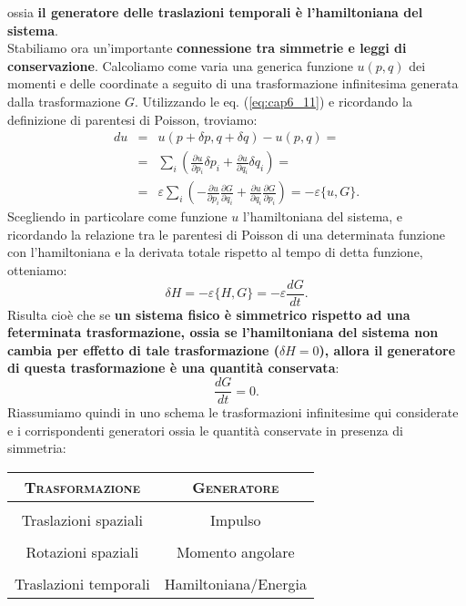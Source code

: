 \documentclass[a4paper,12pt,oneside]{book}
\begin{document}
ossia \textbf{il generatore delle traslazioni temporali è l'hamiltoniana del sistema}.\\
Stabiliamo ora un'importante \textbf{connessione tra simmetrie e leggi di conservazione}. Calcoliamo come varia una generica funzione $u(p,q)$ dei momenti e delle coordinate a seguito di una trasformazione infinitesima generata dalla trasformazione $G$. Utilizzando le eq. (\ref{eq:cap6_11}) e ricordando la definizione di parentesi di Poisson, troviamo:
\begin{eqnarray}
du & = & u(p+\delta p , q+\delta q )- u (p,q) = \nonumber \\
&=& \sum _i \left( \frac{\partial u}{\partial p_i} \delta p_i + \frac{\partial u}{\partial q_i } \delta q_i \right) = \nonumber \\
&=& \varepsilon \sum _i \left( -\frac{\partial u}{\partial p_i} \frac{\partial G}{\partial q_i} + \frac{\partial u}{\partial q_i } \frac{\partial G}{\partial p_i} \right) =-\varepsilon \{ u, G \} .
\end{eqnarray}
Scegliendo in particolare come funzione $u$ l'hamiltoniana del sistema,  e ricordando la relazione tra le parentesi di Poisson di una determinata funzione con l'hamiltoniana e la derivata totale rispetto al tempo di detta funzione, otteniamo:
\begin{equation}
\delta H = -\varepsilon \{H,G\} = -\varepsilon \frac{dG}{dt}.
\end{equation}
Risulta cioè che se \textbf{un sistema fisico è simmetrico rispetto ad una feterminata trasformazione, ossia se l'hamiltoniana del sistema non cambia per effetto di tale trasformazione ($\delta H =0$), allora il generatore di questa trasformazione è una quantità conservata}:
\begin{equation}
\frac{dG}{dt}=0.
\end{equation}
Riassumiamo quindi in uno schema le trasformazioni infinitesime qui considerate e i corrispondenti generatori ossia le quantità conservate in presenza di simmetria:

\begin{table}[!htbp]
\begin{center}
\begin{tabular}{c|c}
\textbf{\textsc{Trasformazione}} & \textbf{\textsc{Generatore}}\\
\hline \\
Traslazioni spaziali & Impulso \\
\hline \\
Rotazioni spaziali & Momento angolare \\
\hline \\
Traslazioni temporali &  Hamiltoniana/Energia \\
\hline 
\end{tabular}
\end{center}
\end{table}
\end{document}
